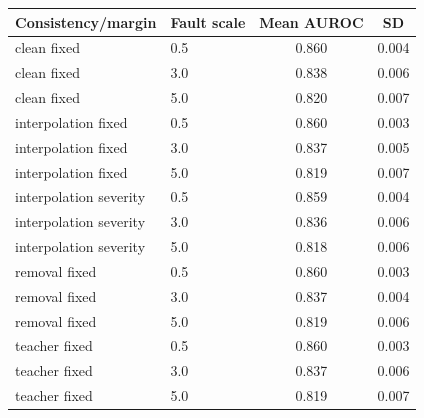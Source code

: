 \begin{tabular}{llcc}
\toprule
Consistency/margin & Fault scale & Mean AUROC & SD \\
\midrule
clean fixed & 0.5 & 0.860 & 0.004 \\
clean fixed & 3.0 & 0.838 & 0.006 \\
clean fixed & 5.0 & 0.820 & 0.007 \\
interpolation fixed & 0.5 & 0.860 & 0.003 \\
interpolation fixed & 3.0 & 0.837 & 0.005 \\
interpolation fixed & 5.0 & 0.819 & 0.007 \\
interpolation severity & 0.5 & 0.859 & 0.004 \\
interpolation severity & 3.0 & 0.836 & 0.006 \\
interpolation severity & 5.0 & 0.818 & 0.006 \\
removal fixed & 0.5 & 0.860 & 0.003 \\
removal fixed & 3.0 & 0.837 & 0.004 \\
removal fixed & 5.0 & 0.819 & 0.006 \\
teacher fixed & 0.5 & 0.860 & 0.003 \\
teacher fixed & 3.0 & 0.837 & 0.006 \\
teacher fixed & 5.0 & 0.819 & 0.007 \\
\bottomrule
\end{tabular}
